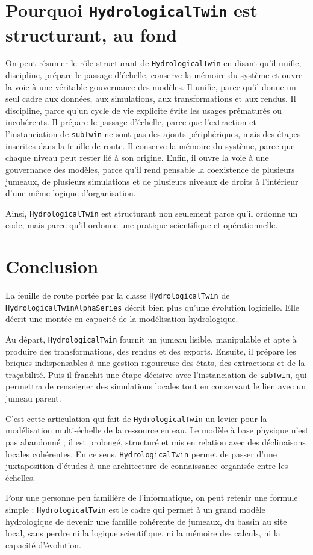 \documentclass[11pt,a4paper]{article}
\newcommand{\hydrot}{\texttt{HydrologicalTwin}}
\newcommand{\alphaht}{\texttt{HydrologicalTwinAlphaSeries}}
\begin{document}
\section{Pourquoi \hydrot{} est structurant, au fond}

On peut résumer le rôle structurant de \hydrot{} en disant qu'il unifie, discipline, prépare le passage d'échelle, conserve la mémoire du système et ouvre la voie à une véritable gouvernance des modèles. Il unifie, parce qu'il donne un seul cadre aux données, aux simulations, aux transformations et aux rendus. Il discipline, parce qu'un cycle de vie explicite évite les usages prématurés ou incohérents. Il prépare le passage d'échelle, parce que l'extraction et l'instanciation de \texttt{subTwin} ne sont pas des ajouts périphériques, mais des étapes inscrites dans la feuille de route. Il conserve la mémoire du système, parce que chaque niveau peut rester lié à son origine. Enfin, il ouvre la voie à une gouvernance des modèles, parce qu'il rend pensable la coexistence de plusieurs jumeaux, de plusieurs simulations et de plusieurs niveaux de droits à l'intérieur d'une même logique d'organisation.

Ainsi, \hydrot{} est structurant non seulement parce qu'il ordonne un code, mais parce qu'il ordonne une pratique scientifique et opérationnelle.

\section{Conclusion}

La feuille de route portée par la classe \texttt{HydrologicalTwin} de \alphaht{} décrit bien plus qu'une évolution logicielle. Elle décrit une montée en capacité de la modélisation hydrologique.

Au départ, \hydrot{} fournit un jumeau lisible, manipulable et apte à produire des transformations, des rendus et des exports. Ensuite, il prépare les briques indispensables à une gestion rigoureuse des états, des extractions et de la traçabilité. Puis il franchit une étape décisive avec l'instanciation de \texttt{subTwin}, qui permettra de renseigner des simulations locales tout en conservant le lien avec un jumeau parent.

C'est cette articulation qui fait de \hydrot{} un levier pour la modélisation multi-échelle de la ressource en eau. Le modèle à base physique n'est pas abandonné ; il est prolongé, structuré et mis en relation avec des déclinaisons locales cohérentes. En ce sens, \hydrot{} permet de passer d'une juxtaposition d'études à une architecture de connaissance organisée entre les échelles.

Pour une personne peu familière de l'informatique, on peut retenir une formule simple : \hydrot{} est le cadre qui permet à un grand modèle hydrologique de devenir une famille cohérente de jumeaux, du bassin au site local, sans perdre ni la logique scientifique, ni la mémoire des calculs, ni la capacité d'évolution.
\end{document}
